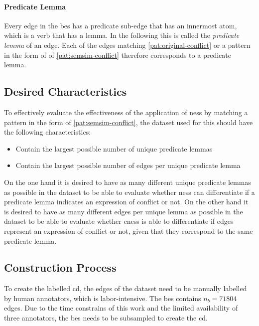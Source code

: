 \documentclass[11pt]{scrreprt}
\begin{document}
{\paragraph{Predicate Lemma} Every edge in the \gls{bes} has a predicate sub-edge that has an innermost atom, which is a verb that has a lemma. In the following this is called the \textit{predicate lemma} of an edge. Each of the edges matching \cref{pat:original-conflict} or a pattern in the form of of \cref{pat:semsim-conflict} therefore corresponds to a predicate lemma.


\subsection{Desired Characteristics}
\label{sec:dataset-characteristics}
To effectively evaluate the effectiveness of the application of \gls{ness} by matching a pattern in the form of \cref{pat:semsim-conflict}, the dataset used for this should have the following characteristics:

\begin{itemize}
	\item Contain the largest possible number of unique predicate lemmas
	\item Contain the largest possible number of edges per unique predicate lemma
\end{itemize}

On the one hand it is desired to have as many different unique predicate lemmas as possible in the dataset to be able to evaluate whether \gls{ness} can differentiate if a predicate lemma indicates an expression of conflict or not. On the other hand it is desired to have as many different edges per unique lemma as possible in the dataset to be able to evaluate whether \gls{cness} is able to differentiate if edges represent an expression of conflict or not, given that they correspond to the same predicate lemma.

\subsection{Construction Process}
To create the labelled \gls{cd}, the edges of the dataset need to be manually labelled by human annotators, which is labor-intensive. The \gls{bes} contains \(n_b=71804\) edges. Due to the time constrains of this work and the limited availability of three annotators, the \gls{bes} needs to be subsampled to create the \gls{cd}. 

}
\end{document}
